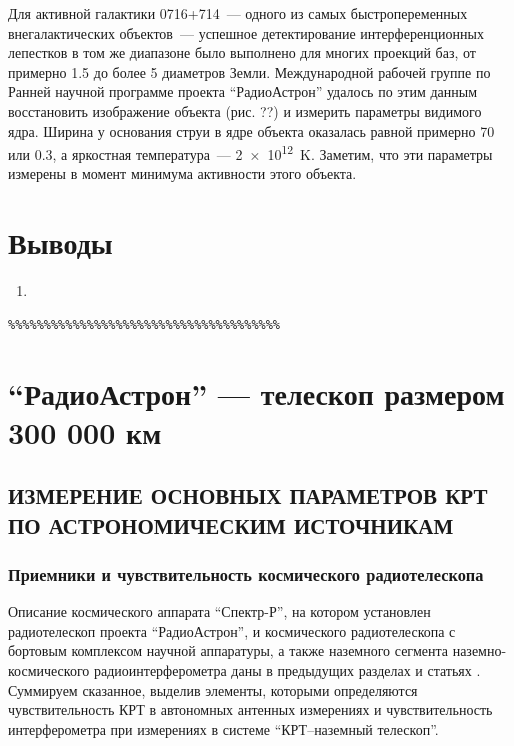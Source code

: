Для активной галактики 0716+714~--- одного из самых быстропеременных внегалактических объектов~---
успешное детектирование интерференционных лепестков в том же диапазоне было выполнено для многих
проекций баз, от примерно 1.5 до более 5 диаметров Земли. Международной рабочей группе по Ранней
научной программе проекта ``РадиоАстрон'' удалось по этим данным восстановить изображение объекта
(рис. ??) и измерить параметры видимого ядра. Ширина у основания струи в ядре объекта оказалась
равной примерно \SI{70}{\uas} или \SI{0.3}{\parsec}, а яркостная температура~--- \SI{2e12}{\kelvin}.
Заметим, что эти параметры измерены в момент минимума активности этого объекта.

\section{Выводы}

\begin{enumerate}
 \item
\end{enumerate}


\begin{verbatim}
%%%%%%%%%%%%%%%%%%%%%%%%%%%%%%%%%%%%%%
\end{verbatim}


\section{``РадиоАстрон'' --- телескоп размером 300 000 км}

\subsection{ИЗМЕРЕНИЕ ОСНОВНЫХ ПАРАМЕТРОВ КРТ
         ПО АСТРОНОМИЧЕСКИМ ИСТОЧНИКАМ}

\subsubsection{Приемники и чувствительность космического радиотелескопа}

Описание космического аппарата ``Спектр-Р'', на котором установлен радиотелескоп проекта
``РадиоАстрон'', и космического радиотелескопа с бортовым комплексом научной аппаратуры, а также
наземного сегмента наземно-космического радиоинтерферометра даны в предыдущих разделах и статьях
\cite{Khartov_2011,Alexandrov_2011a,Alexandrov_2011b}. Суммируем сказанное, выделив элементы,
которыми определяются чувствительность КРТ в автономных антенных измерениях и чувствительность
интерферометра при измерениях в системе ``КРТ--наземный телескоп''.

